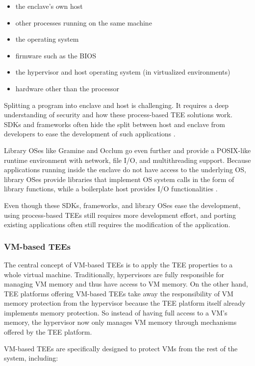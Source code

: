\begin{itemize}
  \item the enclave's own host
  \item other processes running on the same machine
  \item the operating system
  \item firmware such as the BIOS
  \item the hypervisor and host operating system (in virtualized environments)
  \item hardware other than the processor
\end{itemize}

Splitting a program into enclave and host is challenging. It requires a deep
understanding of security and how these process-based TEE solutions work. SDKs
and frameworks often hide the split between host and enclave from developers to
ease the development of such applications \cite{schuster2022}.

Library OSes like Gramine and Occlum go even further and provide a POSIX-like
runtime environment with network, file I/O, and multithreading support. Because
applications running inside the enclave do not have access to the underlying OS,
library OSes provide libraries that implement OS system calls in the form of
library functions, while a boilerplate host provides I/O functionalities
\cite{tsai2014graphene}.

Even though these SDKs, frameworks, and library OSes ease the development, using
process-based TEEs still requires more development effort, and porting existing
applications often still requires the modification of the application.

\subsubsection{VM-based TEEs}
\label{sec:vm-based-tees}

The central concept of VM-based TEEs is to apply the TEE properties to a whole
virtual machine. Traditionally, hypervisors are fully responsible for managing
VM memory and thus have access to VM memory. On the other hand, TEE platforms
offering VM-based TEEs take away the responsibility of VM memory protection from
the hypervisor because the TEE platform itself already implements memory
protection. So instead of having full access to a VM's memory, the hypervisor
now only manages VM memory through mechanisms offered by the TEE platform.

VM-based TEEs are specifically designed to protect VMs from the rest of the
system, including:

